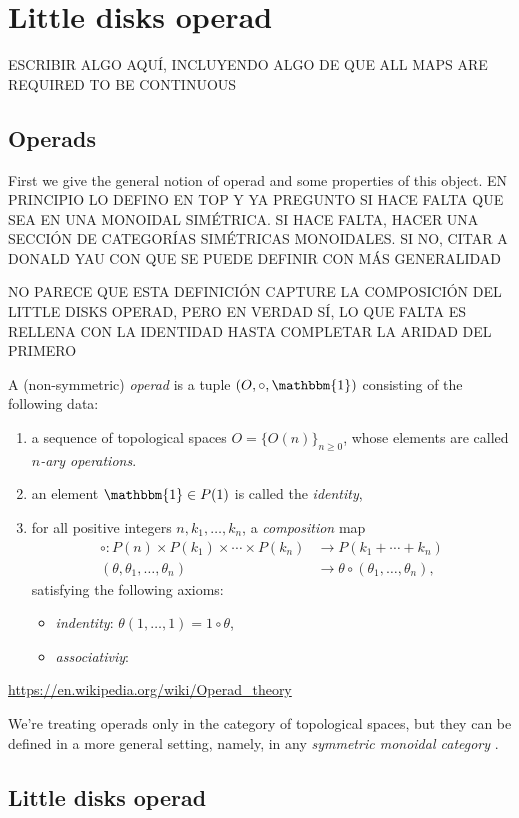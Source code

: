 \documentclass[TFM.tex]{subfiles}
\begin{document}
\chapter{Little disks operad}

ESCRIBIR ALGO AQUÍ, INCLUYENDO ALGO DE QUE ALL MAPS ARE REQUIRED TO BE CONTINUOUS


\section{Operads}
First we give the general notion of operad and some properties of this object. EN PRINCIPIO LO DEFINO EN TOP Y YA PREGUNTO SI HACE FALTA QUE SEA EN UNA MONOIDAL SIMÉTRICA. SI HACE FALTA, HACER UNA SECCIÓN DE CATEGORÍAS SIMÉTRICAS MONOIDALES. SI NO, CITAR A DONALD YAU CON QUE SE PUEDE DEFINIR CON MÁS GENERALIDAD


NO PARECE QUE ESTA DEFINICIÓN CAPTURE LA COMPOSICIÓN DEL LITTLE DISKS OPERAD, PERO EN VERDAD SÍ, LO QUE FALTA ES RELLENA CON LA IDENTIDAD HASTA COMPLETAR LA ARIDAD DEL PRIMERO
\begin{defi}
A (non-symmetric) \emph{operad} is a tuple $(O, \circ, \mathbbm{1})$ consisting of the following data:
\begin{enumerate}[(1)]
\item a sequence of topological spaces $O=\{O(n)\}_{n\geq 0}$, whose elements are called \emph{$n$-ary operations}.
\item an element $\mathbbm{1}\in P(1)$ is called the \emph{identity},
\item for all positive integers $n,k_1,\dots, k_n$, a \emph{composition} map
\begin{align*}
\circ:P(n)\times P(k_1)\times\cdots\times P(k_n)&\to P(k_1+\cdots+k_n)\\
(\theta, \theta_1,\dots, \theta_n)&\to \theta\circ(\theta_1,\dots, \theta_n),
\end{align*}
satisfying the following axioms:
\begin{itemize}
\item \emph{indentity}: $\theta(1,\dots, 1)=1\circ\theta$,
\item \emph{associativiy}:
\end{itemize}
\end{enumerate}
\end{defi}

\url{https://en.wikipedia.org/wiki/Operad_theory}

We're treating operads only in the category of topological spaces, but they can be defined in a more general setting, namely, in any \emph{symmetric monoidal category} \cite{Yau}.

\section{Little disks operad}
\end{document}
